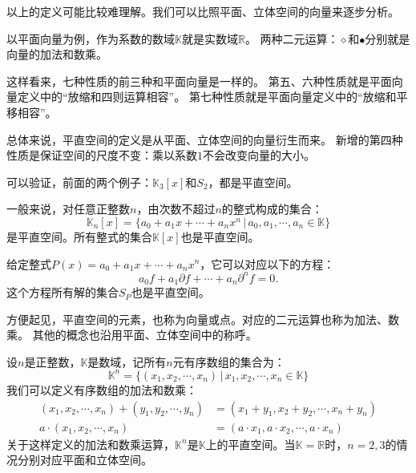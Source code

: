 \documentclass[12pt,UTF8,fontset=none]{ctexbook}
\begin{document}
以上的定义可能比较难理解。我们可以比照平面、立体空间的向量来逐步分析。

以平面向量为例，作为系数的数域$\mathbb{K}$就是实数域$\mathbb{R}$。
两种二元运算：$\diamond$和$\bullet$分别就是向量的加法和数乘。

这样看来，七种性质的前三种和平面向量是一样的。
第五、六种性质就是平面向量定义中的“放缩和四则运算相容”。
第七种性质就是平面向量定义中的“放缩和平移相容”。

总体来说，平直空间的定义是从平面、立体空间的向量衍生而来。
新增的第四种性质是保证空间的尺度不变：乘以系数$1$不会改变向量的大小。

可以验证，前面的两个例子：$\mathbb{K}_3[x]$和$S_2$，都是平直空间。

一般来说，对任意正整数$n$，由次数不超过$n$的整式构成的集合：
$$ \mathbb{K}_n[x] = \{a_0 + a_1 x + \cdots + a_n x^n \, | \, a_0, a_1, \cdots , a_n \in \mathbb{K}\} $$
是平直空间。所有整式的集合$\mathbb{K}[x]$也是平直空间。

给定整式$P(x) = a_0 + a_1 x + \cdots + a_n x^n$，它可以对应以下的方程：
$$ a_0 f + a_1 \partial f + \cdots + a_n \partial^n f = 0. $$
这个方程所有解的集合$S_P$也是平直空间。

方便起见，平直空间的元素，也称为向量或点。对应的二元运算也称为加法、数乘。
其他的概念也沿用平面、立体空间中的称呼。

设$n$是正整数，$\mathbb{K}$是数域，记所有$n$元有序数组的集合为：
$$ \mathbb{K}^n = \{(x_1, x_2, \cdots , x_n) \, | \, x_1, x_2, \cdots , x_n \in \mathbb{K}\}$$
我们可以定义有序数组的加法和数乘：
\begin{align*}
    (x_1, x_2, \cdots , x_n) + (y_1, y_2, \cdots , y_n) &= (x_1 + y_1, x_2 + y_2, \cdots , x_n + y_n) \\
    a\cdot (x_1, x_2, \cdots , x_n) &= (a\cdot x_1, a\cdot x_2, \cdots , a\cdot x_n)
\end{align*}
关于这样定义的加法和数乘运算，$\mathbb{K}^n$是$\mathbb{K}$上的平直空间。当$\mathbb{K}=\mathbb{R}$时，$n=2,3$的情况分别对应平面和立体空间。
\end{document}
